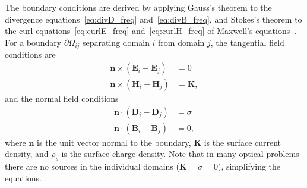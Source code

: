     The boundary conditions are derived by applying Gauss's theorem to
     the divergence equations~\eqref{eq:divD_freq} and~\eqref{eq:divB_freq}, and Stokes's
      theorem to the curl equations~\eqref{eq:curlE_freq} and~\eqref{eq:curlH_freq} of
       Maxwell's equations~\cite{novotny}.
       For a boundary $\partial \Omega_{ij}$ separating domain
$i$ from domain $j$, the tangential field conditions are~\cite{novotny}
    \begin{align}
        \mathbf{n} \times (\mathbf{E}_i - \mathbf{E}_j) & = 0 \label{eq:BC_E} \\
        \mathbf{n} \times (\mathbf{H}_i - \mathbf{H}_j) & = \mathbf{K} ,
        \label{eq:BC_H}
    \end{align}
    and the normal field conditions
    \begin{align}
        \mathbf{n} \cdot (\mathbf{D}_i - \mathbf{D}_j) & = \sigma \label{eq:BC_D} \\
        \mathbf{n} \cdot (\mathbf{B}_i - \mathbf{B}_j) & = 0, \label{eq:BC_B}
    \end{align}
    where $\mathbf{n}$ is the unit vector normal to the boundary, $\mathbf{K}$ is the
    surface current density,
    and $\rho_s$ is the surface charge density. Note that in many optical problems
    there are no
    sources in the individual domains ($\mathbf{K}=\sigma=0)$, simplifying the
    equations.

%

